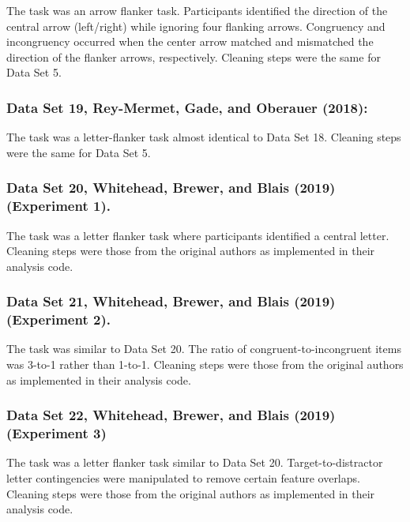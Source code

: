 \documentclass[
  english,
  ,man]{apa6}
\begin{document}
The task was an arrow flanker task. Participants identified the direction of the central arrow (left/right) while ignoring four flanking arrows. Congruency and incongruency occurred when the center arrow matched and mismatched the direction of the flanker arrows, respectively. Cleaning steps were the same for Data Set 5.

\hypertarget{data-set-19-reymermetetal2018}{%
\subsubsection{Data Set 19, Rey-Mermet, Gade, and Oberauer (2018):}\label{data-set-19-reymermetetal2018}}

The task was a letter-flanker task almost identical to Data Set 18. Cleaning steps were the same for Data Set 5.

\hypertarget{data-set-20-whitehead.etal.2019-experiment-1.}{%
\subsubsection{Data Set 20, Whitehead, Brewer, and Blais (2019) (Experiment 1).}\label{data-set-20-whitehead.etal.2019-experiment-1.}}

The task was a letter flanker task where participants identified a central letter. Cleaning steps were those from the original authors as implemented in their analysis code.

\hypertarget{data-set-21-whitehead.etal.2019-experiment-2.}{%
\subsubsection{Data Set 21, Whitehead, Brewer, and Blais (2019) (Experiment 2).}\label{data-set-21-whitehead.etal.2019-experiment-2.}}

The task was similar to Data Set 20. The ratio of congruent-to-incongruent items was 3-to-1 rather than 1-to-1. Cleaning steps were those from the original authors as implemented in their analysis code.

\hypertarget{data-set-22-whitehead.etal.2019-experiment-3}{%
\subsubsection{Data Set 22, Whitehead, Brewer, and Blais (2019) (Experiment 3)}\label{data-set-22-whitehead.etal.2019-experiment-3}}

The task was a letter flanker task similar to Data Set 20. Target-to-distractor letter contingencies were manipulated to remove certain feature overlaps. Cleaning steps were those from the original authors as implemented in their analysis code.
\end{document}
